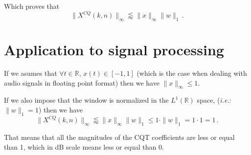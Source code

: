 \documentclass[12pt]{article}
\begin{document}
Which proves that 
$$ \|X^{CQ}(k,n)\|_{\infty} \lessapprox \| x \|_{\infty} \| w \|_1 \, . $$

\section{Application to signal processing}

If we asumes that $\forall t \in \mathbb{R}$, $x(t) \in [-1, 1]$ (which is the case when dealing with audio signals in floating point format) then we have $\|x\|_{\infty} \leq 1$.

If we also impose that the window is normalized in the $L^{1}(\mathbb{R})$ space, (\textit{i.e.}: $\|w\|_1 = 1$) then we have 
$$ \|X^{CQ}(k,n)\|_{\infty} \lessapprox \| x \|_{\infty} \| w \|_1 \leq 1 \cdot \| w \|_1 = 1 \cdot 1 = 1 \, . $$

That means that all the magnitudes of the CQT coefficients are less or equal than 1, which in dB scale means less or equal than 0.
\end{document}
